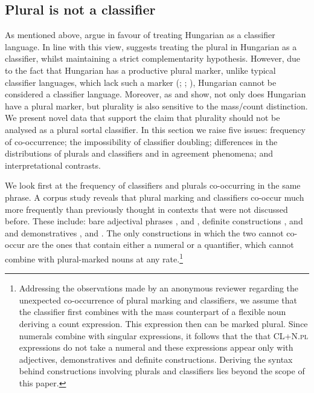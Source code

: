\documentclass[output=paper]{langscibook}
\begin{document}
\subsection{Plural is not a classifier} \label{schv-nem:sec:3.1}

As mentioned above, \citet{csirmaz-dekany-14} argue in favour of treating Hungarian as a classifier language. In line with this view, \citet{dekany-11} suggests treating the plural in Hungarian as a classifier, whilst maintaining a strict complementarity hypothesis.  However, due to the fact that Hungarian has a productive plural marker, unlike typical classifier languages, which lack such a marker
(\citealt{chierchia-98a}; \citeyear{Chierchia-2010}; \citealt{cheng-sybesma-99}), Hungarian cannot be considered a classifier language. Moreover, as \citet{schvarcz-14} and \citet{schvarcz-rothstein-17} show, not only does Hungarian have a plural marker, but plurality is also sensitive to the mass/count distinction. We present novel data that support the claim that plurality should not be analysed as a plural sortal classifier.  In this section we raise five issues: frequency of co-occurrence; the impossibility of classifier doubling; differences in the distributions of plurals and classifiers and in agreement phenomena; and interpretational contrasts.

We look first at the frequency of classifiers and plurals co-occurring in the same phrase. A corpus study reveals that plural marking and classifiers co-occur much more frequently than previously thought in contexts that were not discussed before. These include: bare adjectival phrases ,  and , definite constructions ,  and  and demonstratives ,  and . The only constructions in which the two cannot co-occur are the ones that contain either a numeral or a quantifier, which cannot combine with plural-marked nouns at any rate.\footnote{Addressing the observations made by an anonymous reviewer regarding the unexpected co-occurrence of plural marking and classifiers, we assume that the classifier first combines with the mass counterpart of a flexible noun deriving a count expression. This expression then can be marked plural. Since numerals combine with singular expressions, it follows that the  that CL+N.\textsc{pl} expressions do not take a numeral and these expressions appear only with adjectives, demonstratives and definite constructions. Deriving the syntax behind constructions involving plurals and classifiers lies beyond the scope of this paper.}
\end{document}
